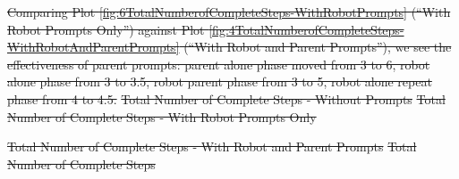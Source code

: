 \documentclass{ut-thesis}
\providecommand{\DIFdeltex}[1]{{\protect\color{red}\sout{#1}}}                      %
\providecommand{\DIFdelbegin}{} %
\providecommand{\DIFdelFL}[1]{\DIFdel{#1}} %
\providecommand{\DIFdel}[1]{\texorpdfstring{\DIFdeltex{#1}}{}} %
\begin{document}
\DIFdelbegin \DIFdel{Comparing Plot \ref{fig:6TotalNumberofCompleteSteps-WithRobotPrompts} (``With Robot Prompts Only'') against Plot \ref{fig:4TotalNumberofCompleteSteps-WithRobotAndParentPrompts} (``With Robot and Parent Prompts''), we see the effectiveness of parent prompts: parent alone phase moved from 3 to 6, robot alone phase from 3 to 3.5, robot parent phase from 3 to 5, robot alone repeat phase from 4 to 4.5.  }%
{%
\DIFdelFL{Total Number of Complete Steps - Without Prompts}}
{%
\DIFdelFL{Total Number of Complete Steps - With Robot Prompts Only}}

{%
\DIFdelFL{Total Number of Complete Steps - With Robot and Parent Prompts}}
{%
\DIFdelFL{Total Number of Complete Steps}}
\end{document}
